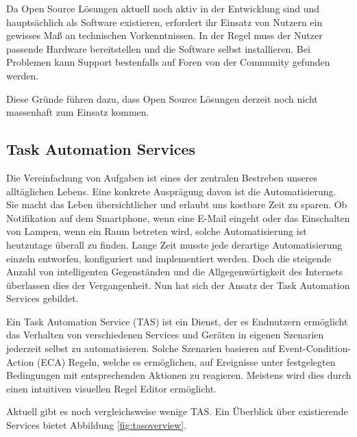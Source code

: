 Da Open Source Lösungen aktuell noch aktiv in der Entwicklung sind und hauptsächlich als Software existieren, erfordert ihr Einsatz von Nutzern ein gewisses Maß an technischen Vorkenntnissen. In der Regel muss der Nutzer passende Hardware bereitstellen und die Software selbst installieren. Bei Problemen kann Support bestenfalls auf Foren von der Community gefunden werden. 

Diese Gründe führen dazu, dass Open Source Lösungen derzeit noch nicht massenhaft zum Einsatz kommen.



\subsection{Task Automation Services}
\label{subsec:tas}
Die Vereinfachung von Aufgaben ist eines der zentralen Bestreben unseres alltäglichen Lebens. Eine konkrete Ausprägung davon ist die Automatisierung. Sie macht das Leben übersichtlicher und erlaubt uns kostbare Zeit zu sparen. Ob Notifikation auf dem Smartphone, wenn eine E-Mail eingeht oder das Einschalten von Lampen, wenn ein Raum betreten wird, solche Automatisierung ist heutzutage überall zu finden. Lange Zeit musste jede derartige Automatisierung einzeln entworfen, konfiguriert und implementiert werden. Doch die steigende Anzahl von intelligenten Gegenständen und die Allgegenwärtigkeit des Internets überlassen dies der Vergangenheit. Nun hat sich der Ansatz der Task Automation Services\cite{ieee:tas} gebildet.

Ein Task Automation Service (TAS) ist ein Dienst, der es Endnutzern ermöglicht das Verhalten von verschiedenen Services und Geräten in eigenen Szenarien jederzeit selbst zu automatisieren. Solche Szenarien basieren auf Event-Condition-Action (ECA) Regeln\cite{ECA}, welche es ermöglichen, auf Ereignisse unter festgelegten Bedingungen mit entsprechenden Aktionen zu reagieren. Meistens wird dies durch  einen intuitiven visuellen Regel Editor ermöglicht.


Aktuell gibt es noch vergleichsweise wenige TAS. Ein Überblick über existierende  Services bietet Abbildung \ref{fig:tasoverview}.

